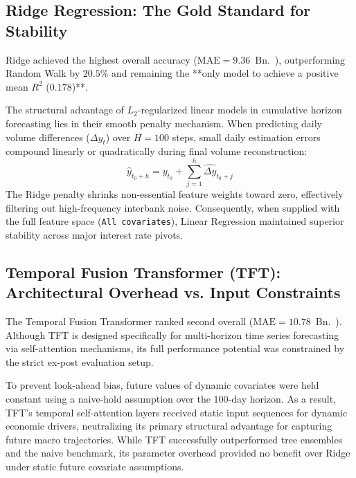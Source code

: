 \documentclass[11pt,a4paper]{article}
\begin{document}
\subsection{Ridge Regression: The Gold Standard for Stability}
Ridge achieved the highest overall accuracy ($\text{MAE} = 9.36$~Bn.~\texteuro), outperforming Random Walk by $20.5\%$ and remaining the **only model to achieve a positive mean $R^2$ ($0.178$)**. 

The structural advantage of $L_2$-regularized linear models in cumulative horizon forecasting lies in their smooth penalty mechanism. When predicting daily volume differences ($\Delta y_t$) over $H = 100$ steps, small daily estimation errors compound linearly or quadratically during final volume reconstruction:
\begin{equation}
    \widehat{y}_{t_0+h} = y_{t_0} + \sum_{j=1}^{h} \widehat{\Delta y}_{t_0+j}
\end{equation}
The Ridge penalty shrinks non-essential feature weights toward zero, effectively filtering out high-frequency interbank noise. Consequently, when supplied with the full feature space (\texttt{All covariates}), Linear Regression maintained superior stability across major interest rate pivots.

\subsection{Temporal Fusion Transformer (TFT): Architectural Overhead vs. Input Constraints}
The Temporal Fusion Transformer ranked second overall ($\text{MAE} = 10.78$~Bn.~\texteuro). Although TFT is designed specifically for multi-horizon time series forecasting via self-attention mechanisms, its full performance potential was constrained by the strict ex-post evaluation setup.

To prevent look-ahead bias, future values of dynamic covariates were held constant using a naive-hold assumption over the $100$-day horizon. As a result, TFT’s temporal self-attention layers received static input sequences for dynamic economic drivers, neutralizing its primary structural advantage for capturing future macro trajectories. While TFT successfully outperformed tree ensembles and the naive benchmark, its parameter overhead provided no benefit over Ridge under static future covariate assumptions.
\end{document}
